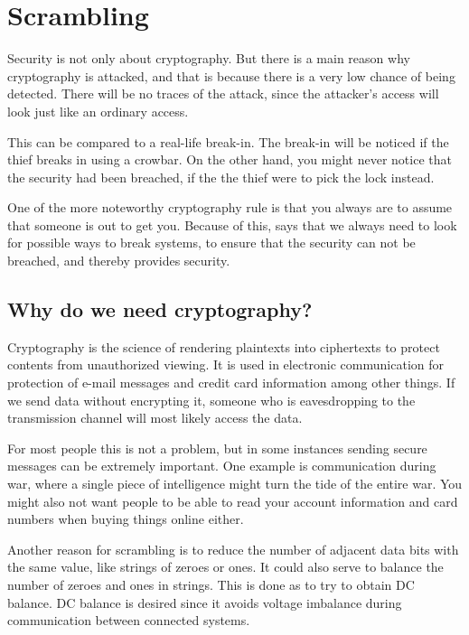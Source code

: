 \chapter{Scrambling}\label{ch:Scrambling}
Security is not only about cryptography. But there is a main reason why 
cryptography is attacked, and that is because there is a very low 
chance of being detected. There will be no traces of the attack, since 
the attacker’s access will look just like an ordinary access.

This can be compared to a real-life break-in. The break-in will be 
noticed if the thief breaks in using a crowbar. On the other hand, you 
might never notice that the security had been breached, if the the 
thief were to pick the lock instead. \citep{Schneier:2003}

One of the more noteworthy cryptography rule is that you always are to 
assume that someone is out to get you. Because of this, 
\citet[pp. 12--14]{Schneier:2003} says that we always need to look for 
possible ways to break systems, to ensure that the security can not be 
breached, and thereby provides security.

\section{Why do we need cryptography?}
Cryptography is the science of rendering plaintexts into ciphertexts to 
protect contents from unauthorized viewing. It is used in electronic 
communication for protection of e-mail messages and credit card 
information among other things. If we send data without encrypting it, 
someone who is eavesdropping to the transmission channel will most 
likely access the data.

For most people this is not a problem, but in some instances sending 
secure messages can be extremely important. One example is 
communication during war, where a single piece of intelligence might 
turn the tide of the entire war. You might also not want people to be 
able to read your account information and card numbers when buying 
things online either.


Another reason for scrambling is to reduce the number of adjacent 
data bits with the same value, like strings of zeroes or ones. It could 
also serve to balance the number of zeroes and ones in strings. This is 
done as to try to obtain DC balance. DC balance is desired since it 
avoids voltage imbalance during communication between connected systems.

